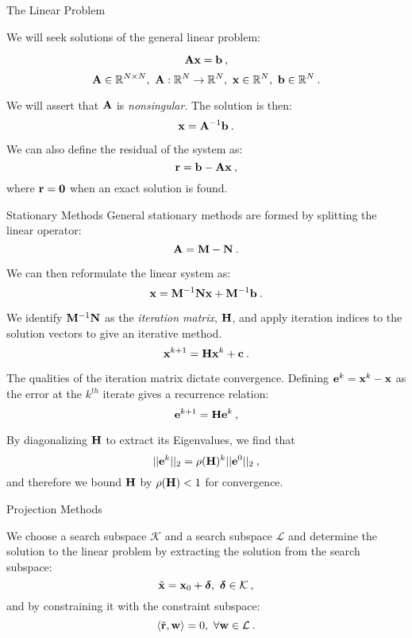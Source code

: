 \documentclass{beamer}
\begin{document}
\begin{frame}{The Linear Problem}

  We will seek solutions of the general linear problem:

  \[
  \mathbf{A} \mathbf{x} = \mathbf{b}\:,
  \]
  \[
  \mathbf{A} \in \mathbb{R}^{N \times N},\ \mathbf{A} : \mathbb{R}^{N}
  \rightarrow \mathbb{R}^{N},\ \mathbf{x} \in \mathbb{R}^N,\ \mathbf{b} \in
  \mathbb{R}^N\:.
  \]

  We will assert that $\mathbf{A}$ is \textit{nonsingular}. The solution
  is then:
  \[
  \mathbf{x} = \mathbf{A}^{-1}\mathbf{b}\:.
  \]

  We can also define the residual of the system as:
  \[
  \mathbf{r} = \mathbf{b} - \mathbf{A}\mathbf{x}\:,
  \]
  where $\mathbf{r}=\mathbf{0}$ when an exact solution is found.

\end{frame}

\begin{frame}{Stationary Methods}
  General stationary methods are formed by splitting the linear
  operator:
  \[
  \mathbf{A} = \mathbf{M} - \mathbf{N}\:.
  \]

  We can then reformulate the linear system as:
  \[
  \mathbf{x} = \mathbf{M}^{-1}\mathbf{N}\mathbf{x} + \mathbf{M}^{-1}\mathbf{b}\:.
  \]

  We identify $\mathbf{M}^{-1}\mathbf{N}$ as the \textit{iteration matrix},
  $\mathbf{H}$, and apply iteration indices to the solution vectors to
  give an iterative method.
  \[
  \mathbf{x}^{k+1} = \mathbf{H}\mathbf{x}^{k} + \mathbf{c}\:.
  \]

  The qualities of the iteration matrix dictate convergence. Defining
  $\mathbf{e}^k = \mathbf{x}^k-\mathbf{x}$ as the error at the $k^{th}$ iterate
  gives a recurrence relation:
  \[
  \mathbf{e}^{k+1} = \mathbf{H} \mathbf{e}^k\:,
  \]
  
  By diagonalizing $\mathbf{H}$ to extract its Eigenvalues, we find that 
  \[
  ||\mathbf{e}^{k}||_2 = \rho(\mathbf{H})^k ||\mathbf{e}^0||_2\:,
  \]
  and therefore we bound $\mathbf{H}$ by $\rho(\mathbf{H}) < 1$ for convergence.

\end{frame}

\begin{frame}{Projection Methods}

  We choose a search subspace $\mathcal{K}$ and a search subspace
  $\mathcal{L}$ and determine the solution to the linear problem by
  extracting the solution from the search subspace:
  \[
  \tilde{\mathbf{x}} = \mathbf{x}_0 +
  \boldsymbol{\delta},\ \boldsymbol{\delta} \in \mathcal{K}\:,
  \]
  and by constraining it with the constraint subspace:
  \[
  \langle \tilde{\ve{r}},\ve{w} \rangle = 0,\ \forall \ve{w} \in
  \mathcal{L}\:.
  \]

\end{frame}
\end{document}
